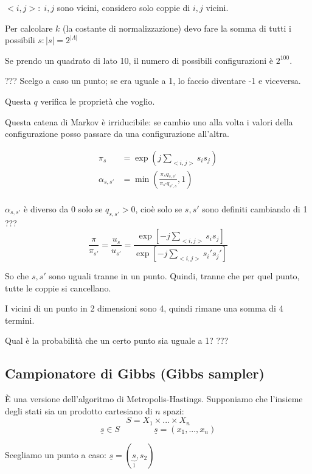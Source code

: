 \documentclass[a4paper,12pt]{book}
\begin{document}
$ <i,j>: \; i,j $ sono vicini, considero solo coppie di $ i,j $ vicini. 

Per calcolare $ k $ (la costante di normalizzazione) devo fare la somma di tutti i possibili $ s: |s| = 2^{|\Lambda|} $ %

Se prendo un quadrato di lato 10, il numero di possibili configurazioni è $ 2^{100} $.

??? %
 Scelgo a caso un punto; se era uguale a 1, lo faccio diventare -1 e viceversa. 

Questa $ q $ verifica le proprietà che voglio. %

Questa catena di Markov è irriducibile: se cambio uno alla volta i valori della configurazione posso passare da una configurazione all'altra.

\begin{align*}
	\pi_s & = \exp (j \sum_{<i,j>} s_i s_j) \\
	\alpha_{s,s'} & = \min \left( \frac{\pi_s q_{s,s'}}{\pi_{s'} q_{s',s}} , 1 \right) \\
\end{align*}

$\alpha_{s,s'}$ è diverso da 0 solo se $ q_{s,s'} > 0 $, cioè solo se $ s,s' $ sono definiti cambiando di 1 ??? %
$$ \frac{\pi}{\pi_{s'}} = \frac{u_s}{u_{s'}} = \frac{\exp \left[ -j \sum_{<i,j>} s_i s_j
	 \right]}{ \exp \left[ -j \sum_{<i,j>} s_i' s_j' \right] } $$

So che $ s,s' $ sono uguali tranne in un punto. Quindi, tranne che per quel punto, tutte le coppie si cancellano. 

I vicini di un punto in 2 dimensioni sono 4, quindi rimane una somma di 4 termini.

Qual è la probabilità che un certo punto sia uguale a 1? ??? %


\subsection{Campionatore di Gibbs (Gibbs sampler)}
È una versione dell'algoritmo di Metropolis-Hastings. Supponiamo che l'insieme degli stati sia un prodotto cartesiano di $ n $ spazi: 
$$ S = X_1 \times ... \times X_n $$
$$ \underline{s} \in S \qquad \qquad \underline{s} = (x_1, ..., x_n) $$

Scegliamo un punto a caso: $ \underline{s} = (\underbrace{s}_1, s_2) $
\end{document}

